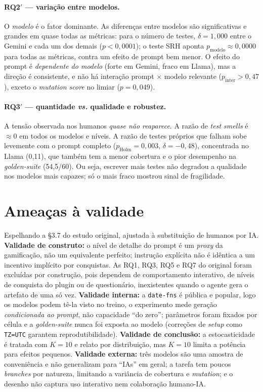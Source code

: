 \documentclass[12pt]{article}
\begin{document}
\paragraph{RQ2$'$ --- variação entre modelos.} O \emph{modelo} é o fator
dominante. As diferenças entre modelos são significativas e grandes em quase
todas as métricas: para o número de testes, $\delta = 1{,}000$ entre o Gemini e
cada um dos demais ($p < 0{,}0001$); o teste SRH aponta $p_{\text{modelo}} \approx
0{,}0000$ para todas as métricas, contra um efeito de prompt bem menor. O efeito
do prompt é \emph{dependente do modelo} (forte em Gemini, fraco em Llama), mas a
direção é consistente, e não há interação prompt $\times$ modelo relevante
($p_{\text{inter}} > 0{,}47$), exceto o \emph{mutation score} no limiar
($p = 0{,}049$).

\paragraph{RQ3$'$ --- quantidade \emph{vs.} qualidade e robustez.} A tensão
observada nos humanos \emph{quase não reaparece}. A razão de \emph{test smells} é
$\approx 0$ em todos os modelos e níveis. A razão de testes próprios que falham
sobe levemente com o prompt completo ($p_{\text{Holm}} = 0{,}003$,
$\delta = -0{,}48$), concentrada no Llama (0{,}11), que também tem a menor
cobertura e o pior desempenho na \emph{golden-suite} (54,5/60). Ou seja, escrever
mais testes não degradou a qualidade nos modelos mais capazes; só o mais fraco
mostrou sinal de fragilidade.

\section{Ameaças à validade}

Espelhando a §3.7 do estudo original, ajustada à substituição de humanos por IA.
\textbf{Validade de construto:} o nível de detalhe do prompt é um \emph{proxy} da
gamificação, não um equivalente perfeito; instrução explícita não é idêntica a um
incentivo implícito por conquistas. As RQ1, RQ3, RQ5 e RQ7 do original foram
excluídas por construção, pois dependem de comportamento interativo, de níveis de
conquista do plugin ou de questionário, inexistentes quando o agente gera o
artefato de uma só vez. \textbf{Validade interna:} a \texttt{date-fns} é pública e
popular, logo os modelos podem tê-la visto no treino, o experimento mede geração
\emph{condicionada ao prompt}, não capacidade ``do zero''; parâmetros foram
fixados por célula e a \emph{golden-suite} nunca foi exposta ao modelo (correções
de \emph{setup} como \texttt{TZ=UTC} garantem reprodutibilidade).
\textbf{Validade de conclusão:} a estocasticidade é tratada com $K=10$ e relato
por distribuição, mas $K=10$ limita a potência para efeitos pequenos.
\textbf{Validade externa:} três modelos são uma amostra de conveniência e não
generalizam para ``IAs'' em geral; a tarefa tem poucos \emph{branches} por
natureza, limitando a variância de cobertura e \emph{mutation}; e o desenho não
captura uso interativo nem colaboração humano-IA.
\end{document}
